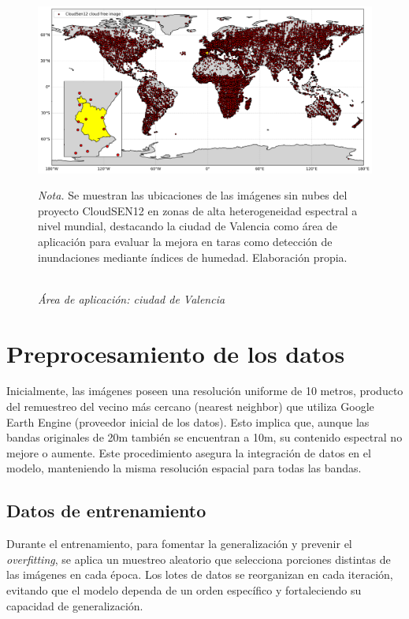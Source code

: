     \begin{figure}[H] 
        \caption{\doublespacing \\ \textit{Área de aplicación: ciudad de Valencia}} 
        \centering
        \includegraphics[width=1\linewidth]{images/mapa_valencia.png}
        \begin{justify}
            \textit{Nota.} Se muestran las ubicaciones de las imágenes sin nubes del proyecto CloudSEN12 en zonas de alta heterogeneidad espectral a nivel mundial, destacando la ciudad de Valencia como área de aplicación para evaluar la mejora en taras como detección de inundaciones mediante índices de humedad. Elaboración propia.
        \end{justify}                    
        \label{fig:mapa_valencia}
    \end{figure}

\section{Preprocesamiento de los datos}

    Inicialmente, las imágenes poseen una resolución uniforme de 10 metros, producto del remuestreo del vecino más cercano (nearest neighbor) que utiliza Google Earth Engine (proveedor inicial de los datos). Esto implica que, aunque las bandas originales de 20m también se encuentran a 10m, su contenido espectral no mejore o aumente. Este procedimiento asegura la integración de datos en el modelo, manteniendo la misma resolución espacial para todas las bandas.

    \subsection{Datos de entrenamiento}

        Durante el entrenamiento, para fomentar la generalización y prevenir el \textit{overfitting}, se aplica un muestreo aleatorio que selecciona porciones distintas de las imágenes en cada época. Los lotes de datos se reorganizan en cada iteración, evitando que el modelo dependa de un orden específico y fortaleciendo su capacidad de generalización.
    
